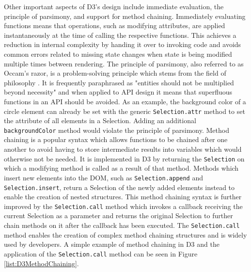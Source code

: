 Other important aspects of D3's design include immediate evaluation, the principle of parsimony, and support for method chaining. Immediately evaluating functions means that operations, such as modifying attributes, are applied instantaneously at the time of calling the respective functions. This achieves a reduction in internal complexity by handing it over to invoking code and avoids common errors related to missing state changes when state is being modified multiple times between rendering. The principle of parsimony, also referred to as Occam's razor, is a problem-solving principle which stems from the field of philosophy \parencite{PrincipleOfParsimony}. It is frequently paraphrased as "entities should not be multiplied beyond necessity" and when applied to API design it means that superfluous functions in an API should be avoided. As an example, the background color of a circle element can already be set with the generic \lstinline{Selection.attr} method to set the  attribute of all elements in a Selection. Adding an additional \lstinline{backgroundColor} method would violate the principle of parsimony. Method chaining is a popular syntax which allows functions to be chained after one another to avoid having to store intermediate results into variables which would otherwise not be needed. It is implemented in D3 by returning the \lstinline{Selection} on which a modifying method is called as a result of that method. Methods which insert new elements into the DOM, such as \lstinline{Selection.append} and \lstinline{Selection.insert}, return a Selection of the newly added elements instead to enable the creation of nested structures. This method chaining syntax is further improved by the \lstinline{Selection.call} method which invokes a callback receiving the current Selection as a parameter and returns the original Selection to further chain methods on it after the callback has been executed. The \lstinline{Selection.call} method enables the creation of complex method chaining structures and is widely used by developers. A simple example of method chaining in D3 and the application of the \lstinline{Selection.call} method can be seen in Figure \ref{list:D3MethodChaining}.

\begin{samepage}
 simple example of method chaining in D3 which creates an  and  element inside a .
  },
]{listings/d3-method-chaining.js}
\end{samepage}

